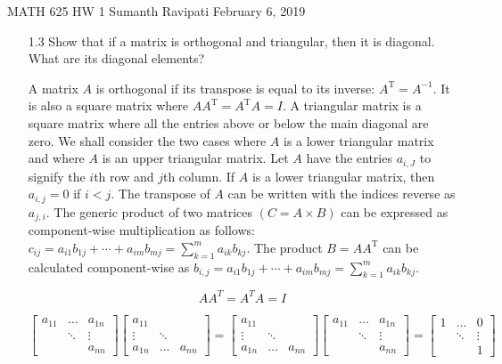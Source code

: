 \documentclass[12pt,letterpaper,reqno]{amsart}
\begin{document}
\thispagestyle{empty}
\begin{center}\large{
    MATH 625\quad
    HW 1\quad
    Sumanth Ravipati\quad
    February 6, 2019}
\end{center}
\vspace{.25in}

\begin{enumerate}
\item[1.3] Show that if a matrix is orthogonal and triangular, then it is diagonal. What are its diagonal elements?
\begin{flushleft}
A matrix $A$ is orthogonal if its transpose is equal to its inverse: $ A^{\mathrm{T}}=A^{-1} $. It is also a square matrix where $AA^{\mathrm{T}} = A^{\mathrm{T}}A = I$. A triangular matrix is a square matrix where all the entries above or below the main diagonal are zero. We shall consider the two cases where $A$ is a lower triangular matrix and where $A$ is an upper triangular matrix. Let $A$ have the entries $a_{i,J}$ to signify the $i$th row and $j$th column. If $A$ is a lower triangular matrix, then $a_{i,j} = 0$ if $i < j$. The transpose of $A$ can be written with the indices reverse as $a_{j,i}$. The generic product of two matrices $(C = A \times B)$ can be expressed as component-wise multiplication as follows: $ c_{i j}=a_{i 1} b_{1 j}+\cdots+a_{i m} b_{m j}=\sum_{k=1}^{m} a_{i k} b_{k j} $. The product $B = AA^{\mathrm{T}}$ can be calculated component-wise as $b_{i,j} =a_{i 1} b_{1 j}+\cdots+a_{i m} b_{m j}=\sum_{k=1}^{m} a_{i k} b_{k j}$.

$$AA^T = A^TA = I$$

$$\begin{bmatrix} { a _ { 11 } } & { \dots } & { a _ { 1 n } } \\ { } & { \ddots } & { \vdots } \\ { } & { } & { a _ { n n } } \end{bmatrix} \begin{bmatrix} { a _ { 11 } } & { } & { } \\ { \vdots } & { \ddots } & { } \\ { a _ { 1 n } }  & { \ldots } & { a _ { n n } } \end{bmatrix} = \begin{bmatrix} { a _ { 11 } } & { } & { } \\ { \vdots } & { \ddots } & { } \\ { a _ { 1 n } }  & { \ldots } & { a _ { n n } } \end{bmatrix} \begin{bmatrix} { a _ { 11 } } & { \dots } & { a _ { 1 n } } \\ { } & { \ddots } & { \vdots } \\ { } & { } & { a _ { n n } } \end{bmatrix} = \begin{bmatrix} { 1 } & { \dots } & { 0 } \\ { } & { \ddots } & { \vdots } \\ { } & { } & { 1 } \end{bmatrix}$$


\end{flushleft}
\end{enumerate}
\end{document}
